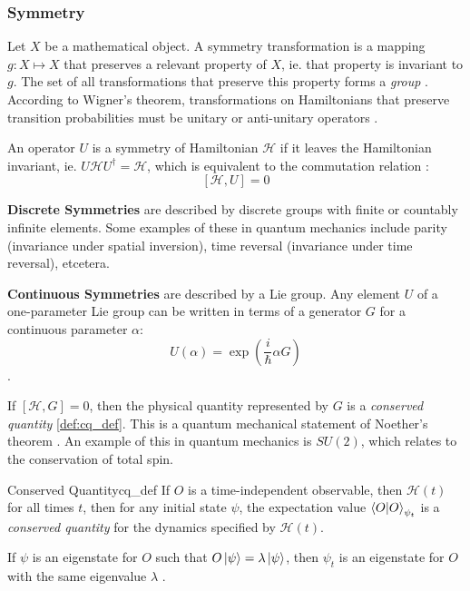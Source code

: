 \documentclass{article}
\newcommand{\ham}{\mathcal{H}}
\begin{document}
\subsubsection{Symmetry}
	
Let $X$ be a mathematical object. A symmetry transformation is a mapping $g: X \mapsto X$ that preserves a relevant property of $X$, ie. that property is invariant to $g$. The set of all transformations that preserve this property forms a \textit{group} \cite{cantwell2016introduction}. According to Wigner's theorem, transformations on Hamiltonians that preserve transition probabilities must be unitary or anti-unitary operators \cite{corry2017symmetry}.
	
An operator $U$ is a symmetry of Hamiltonian $\ham$ if it leaves the Hamiltonian invariant, ie. $U\ham U^\dagger =\ham$, which is equivalent to the commutation relation \cite{corry2017symmetry}: \begin{equation}\label{eq:symcom}[\ham, U] = 0\end{equation}
	
\textbf{Discrete Symmetries} are described by discrete groups with finite or countably infinite elements. Some examples of these in quantum mechanics include parity (invariance under spatial inversion), time reversal (invariance under time reversal), etcetera.
	
\textbf{Continuous Symmetries} are described by a Lie group. Any element $U$ of a one-parameter Lie group can be written in terms of a generator $G$ for a continuous parameter $\alpha$: \begin{equation}
U(\alpha) = \exp\left(\frac{i}{\hslash}\alpha G\right)
\end{equation}.
	
If $[\ham, G] = 0$, then the physical quantity represented by $G$ is a \textit{conserved quantity} \ref{def:cq_def}. This is a quantum mechanical statement of Noether's theorem \cite{ouderaaNoethersRazorLearning2024}. An example of this in quantum mechanics is $SU(2)$, which relates to the conservation of total spin.\\
	
\begin{definition}{Conserved Quantity}{cq_def}
	If $O$ is a time-independent observable, then $\ham(t)$ for all times $t$, then for any initial state $\psi$, the expectation value $\braket{O}_{\psi_t}$ is a \textit{conserved quantity} for the dynamics specified by $\ham(t)$.
			
	If $\psi$ is an eigenstate for $O$ such that $O\ket{\psi} = \lambda \ket{\psi}$, then $\psi_t$ is an eigenstate for $O$ with the same eigenvalue $\lambda$ \cite{corry2017symmetry}.
\end{definition}
	
\end{document}
